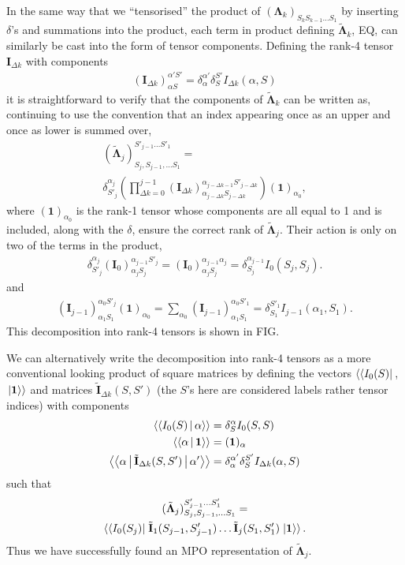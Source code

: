 \documentclass[a4paper, aps, pra,twocolumn]{revtex4-1}
\newcommand{\dket}[1]{\left.\Ket{#1}\right\rangle}
\newcommand{\dbra}[1]{\left\langle\Bra{#1}\right.}
\newcommand{\dbraket}[1]{\left\langle\Braket{#1}\right\rangle}
\begin{document}
In the same way that we ``tensorised'' the product of $(\mathbf{\Lambda}_k)_{S_k S_{k-1} \ldots S_1}$ by inserting $\delta$'s and summations into the product, each term in product defining $\tilde{\mathbf{\Lambda}}_{k}$, EQ, can similarly be cast into the form of tensor components.
Defining the rank-4 tensor $\mathbf{I}_{\Delta k}$ with components
\begin{align}\label{rank4}
(\mathbf{I}_{\Delta k})_{\alpha S}^{\alpha' S'}= \delta_{\alpha}^{\alpha'}\delta_{S}^{S'} I_{\Delta k}(\alpha,S)
\end{align}
it is straightforward to verify that the components of $\tilde{\mathbf{\Lambda}}_{k}$ can be written as, continuing to use the convention that an index appearing once as an upper and once as lower is summed over,
\begin{multline}
(\tilde{\mathbf{\Lambda}}_j)_{ S_j, S_{j-1}, \ldots S_{1}}^{S'_{j-1} \ldots S'_{1}}= \\ \delta_{S'_j}^{\alpha_j}\left(\prod_{\Delta k=0}^{j-1} (\mathbf{I}_{\Delta k})_{\alpha_{j-\Delta k} S_{j-\Delta k}}^{\alpha_{j-\Delta k-1} S'_{j-\Delta k} }\right) (\mathbf{1})_{\alpha_0},
\end{multline}
where $(\mathbf{1})_{\alpha_0}$ is the rank-1 tensor whose components are all equal to 1 and is included, along with the $\delta$, ensure the correct rank of $\tilde{\mathbf{\Lambda}}_j$. Their action is only on two of the terms in the product,
\begin{multline}
\delta^{\alpha_j}_{S'_j}(\mathbf{I}_{0})_{\alpha_j S_j}^{\alpha_{j-1} S'_{j}}=(\mathbf{I}_{0})_{\alpha_j S_j}^{\alpha_{j-1} \alpha_{j}} =\delta_{S_j}^{\alpha_{j-1}}I_{0}(S_j,S_j).
\end{multline}
and
\begin{align}
(\mathbf{I}_{j-1})_{\alpha_1 S_1}^{\alpha_0 S'_j}(\mathbf{1})_{\alpha_0}=\sum_{\alpha_0}(\mathbf{I}_{j-1})_{\alpha_1 S_1}^{\alpha_0 S'_1}= \delta_{S_1}^{S'_1}I_{j-1}(\alpha_1,S_1).
\end{align}
This decomposition into rank-4 tensors is shown in FIG.

We can alternatively write the decomposition into rank-4 tensors as a more conventional looking product of square matrices by defining the vectors $\dbra{I_0(S)}$, $\dket{\mathbf{1}}$ and matrices $\tilde{\mathbf{I}}_{\Delta k}(S,S')$ (the $S$'s here are considered labels rather tensor indices) with components
\begin{align}
 \dbraket{I_0(S)|\alpha}&=\delta_{S}^{\alpha}I_{0}(S,S)\\
 \dbraket{\alpha|\mathbf{1}}&= (\mathbf{1})_\alpha\\
 \dbraket{\alpha|\tilde{\mathbf{I}}_{\Delta k}(S,S')|\alpha'} &= \delta_{\alpha}^{\alpha'}\delta_{S}^{S'} I_{\Delta k}(\alpha,S)
\end{align}
such that
\begin{multline}
(\tilde{\mathbf{\Lambda}}_j)_{ S_j, S_{j-1}, \ldots S_{1}}^{S'_{j-1} \ldots S'_{1}}= \\
\dbra{I_0(S_j)}\tilde{\mathbf{I}}_{1}(S_{j-1},S'_{j-1}) \ldots \tilde{\mathbf{I}}_{j}(S_1,S'_1)\dket{\mathbf{1}}.
\end{multline}
Thus we have successfully found an MPO representation of $\tilde{\mathbf{\Lambda}}_j$.
\end{document}
